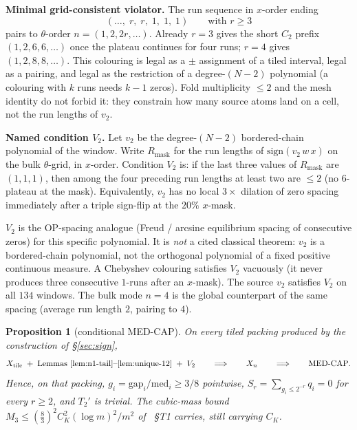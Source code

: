 \documentclass[11pt]{article}
\newtheorem{prop}{Proposition}
\theoremstyle{remark}
\begin{document}
\medskip
\noindent\textbf{Minimal grid-consistent violator.}\enspace
The run sequence in $x$-order ending
\[
(\ldots,\; r,\; r,\; 1,\; 1,\; 1)
\qquad\text{with }r\ge 3
\]
pairs to $\theta$-order $n=(1,2,2r,\ldots)$.  Already $r=3$ gives
the short $C_2$ prefix $(1,2,6,6,\ldots)$ once the plateau continues
for four runs; $r=4$ gives $(1,2,8,8,\ldots)$.  This colouring is
legal as a $\pm$ assignment of a tiled interval, legal as a pairing,
and legal as the restriction of a degree-$(N-2)$ polynomial (a
colouring with $k$ runs needs $k-1$ zeros).  Fold multiplicity
$\le 2$ and the mesh identity do not forbid it: they constrain how
many source atoms land on a cell, not the run lengths of $v_2$.

\medskip
\noindent\textbf{Named condition $V_2$.}\enspace
Let $v_2$ be the degree-$(N-2)$ bordered-chain polynomial of the
window.  Write $R_{\mathrm{mask}}$ for the run lengths of
$\mathrm{sign}(v_2\,w\,x)$ on the bulk $\theta$-grid, in $x$-order.
Condition $V_2$ is: if the last three values of $R_{\mathrm{mask}}$
are $(1,1,1)$, then among the four preceding run lengths at least
two are $\le 2$ (no $6$-plateau at the mask).  Equivalently, $v_2$
has no local $3\times$ dilation of zero spacing immediately after a
triple sign-flip at the $20\%$ $x$-mask.

$V_2$ is the OP-spacing analogue (Freud / arcsine equilibrium
spacing of consecutive zeros) for this specific polynomial.  It is
\emph{not} a cited classical theorem: $v_2$ is a bordered-chain
polynomial, not the orthogonal polynomial of a fixed positive
continuous measure.  A Chebyshev colouring satisfies $V_2$ vacuously
(it never produces three consecutive $1$-runs after an $x$-mask).
The source $v_2$ satisfies $V_2$ on all $134$ windows.  The bulk
mode $n=4$ is the global counterpart of the same spacing (average
run length $2$, pairing to $4$).

\begin{prop}[conditional MED-CAP]\label{prop:conditional}
On every tiled packing produced by the construction of
\S\ref{sec:sign},
\[
X_{\mathrm{tile}}
 \;+\;
\text{Lemmas~\ref{lem:n1-tail}--\ref{lem:unique-12}}
 \;+\;
 V_2
\qquad\Longrightarrow\qquad
 X_n
\qquad\Longrightarrow\qquad
\text{MED-CAP}.
\]
Hence, on that packing, $g_i=\mathrm{gap}_i/\mathrm{med}_i\ge 3/8$
pointwise, $S_r=\sum_{g_i\le 2^{-r}}q_i=0$ for every $r\ge 2$, and
$T_2'$ is trivial.  The cubic-mass bound
$M_3\le(\tfrac83)^2 C_K^2(\log m)^2/m^2$ of \cite{medcap}~\S T1
carries, still carrying $C_K$.
\end{prop}
\end{document}
